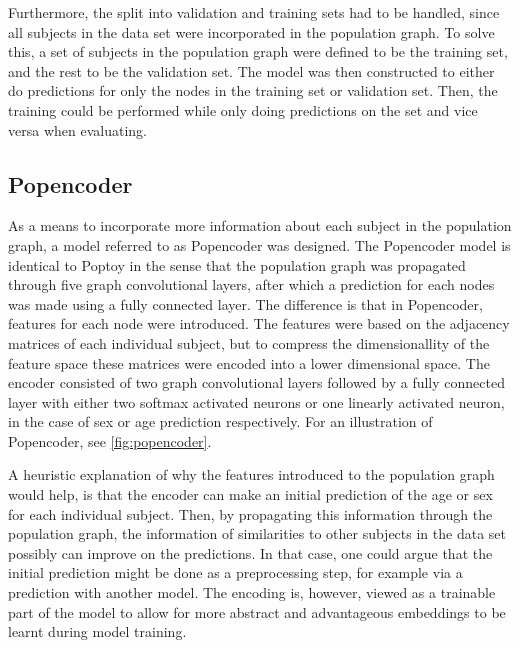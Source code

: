 Furthermore, the split into validation and training sets had to be handled, since all subjects in the data set were incorporated in the population graph. To solve this, a set of subjects in the population graph were defined to be the training set, and the rest to be the validation set. The model was then constructed to either do predictions for only the nodes in the training set or validation set. Then, the training could be performed while only doing predictions on the set and vice versa when evaluating. 




\subsection{Popencoder}
As a means to incorporate more information about each subject in the population graph, a model referred to as Popencoder was designed. The Popencoder model is identical to Poptoy in the sense that the population graph was propagated through five graph convolutional layers, after which a prediction for each nodes was made using a fully connected layer. The difference is that in Popencoder, features for each node were introduced. The features were based on the adjacency matrices of each individual subject, but to compress the dimensionallity of the feature space these matrices were encoded into a lower dimensional space. The encoder consisted of two graph convolutional layers followed by a fully connected layer with either two softmax activated neurons or one linearly activated neuron, in the case of sex or age prediction respectively. For an illustration of Popencoder, see \cref{fig:popencoder}.

A heuristic explanation of why the features introduced to the population graph would help, is that the encoder can make an initial prediction of the age or sex for each individual subject. Then, by propagating this information through the population graph, the information of similarities to other subjects in the data set possibly can improve on the predictions. In that case, one could argue that the initial prediction might be done as a preprocessing step, for example via a prediction with another model. The encoding is, however, viewed as a trainable part of the model to allow for more abstract and advantageous embeddings to be learnt during model training. 



